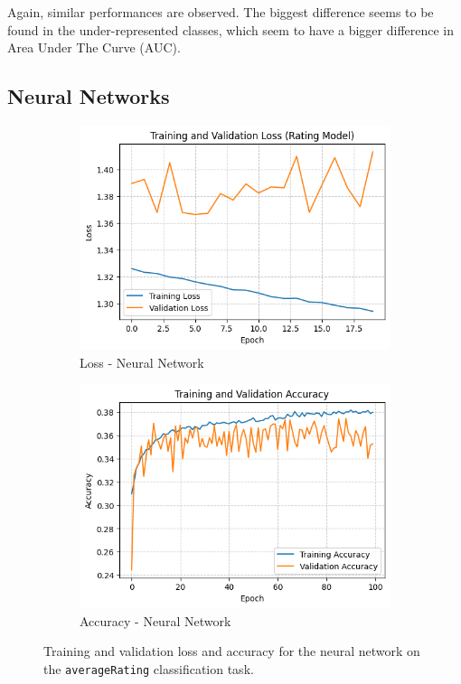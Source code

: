 Again, similar performances are observed. The biggest difference
seems to be found in the under-represented classes, which seem to
have a bigger difference in Area Under The Curve (AUC).




\subsection{Neural Networks}

\begin{figure}
    \centering
    \begin{subfigure}[b]{0.48\textwidth}
        \centering
        \includegraphics[width=\textwidth]{plotsss/loss_rating.png}
        \caption{Loss - Neural Network}
        \label{fig:loss_nn_rating}
    \end{subfigure}
    \hfill
    \begin{subfigure}[b]{0.48\textwidth}
        \centering
        \includegraphics[width=\textwidth]{plotsss/accuracy_rating.png}
        \caption{Accuracy - Neural Network}
        \label{fig:accuracy_nn_rating}
    \end{subfigure}
    \caption{Training and validation loss and accuracy for the neural network on the \texttt{averageRating} classification task.}
    \label{fig:nn_performance_rating}
\end{figure}

